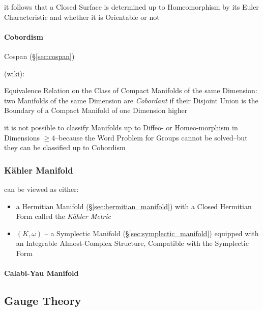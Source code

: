 it follows that a Closed Surface is determined up to Homeomorphism by its Euler
Characteristic and whether it is Orientable or not



\paragraph{Cobordism}\label{sec:cobordism}\hfill

Cospan (\S\ref{sec:cospan})

(wiki):

Equivalence Relation on the Class of Compact Manifolds of the same Dimension:
two Manifolds of the same Dimension are \emph{Cobordant} if their Disjoint
Union is the Boundary of a Compact Manifold of one Dimension higher

it is not possible to classify Manifolds up to Diffeo- or Homeo-morphism in
Dimensions $\geq 4$--because the Word Problem for Groups cannot be solved--but
they can be classified up to Cobordism




\subsubsection{K\"ahler Manifold}\label{sec:kahler_manifold}

can be viewed as either:

\begin{itemize}
\item a Hermitian Manifold (\S\ref{sec:hermitian_manifold}) with a
  Closed Hermitian Form called the \emph{K\"ahler Metric} %
\item $(K,\omega)$ -- a Symplectic Manifold
  (\S\ref{sec:symplectic_manifold}) equipped with an Integrable
  Almost-Complex Structure, Compatible with the Symplectic Form %
\end{itemize}



\paragraph{Calabi-Yau Manifold}\label{sec:calabi_yau_manifold}



\subsection{Gauge Theory}\label{sec:gauge_theory}

